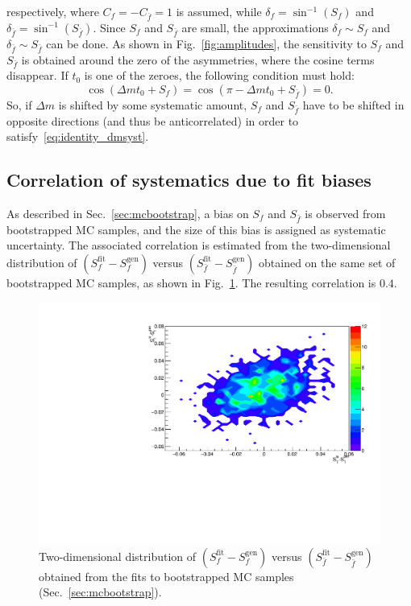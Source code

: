 respectively, where $C_f=-C_{\bar f}=1$ is assumed, while $\delta_f = \sin^{-1}(S_f)$ and $\delta_{\bar f}=\sin^{-1}(S_{\bar f})$.
Since $S_f$ and $S_{\bar f}$ are small, the approximations $\delta_f\sim S_f$ and $\delta_{\bar f}\sim S_{\bar f}$ can be done.
As shown in Fig.~\ref{fig:amplitudes}, the sensitivity to $S_f$ and $S_{\bar f}$ is obtained around the zero of the asymmetries, 
where the cosine terms disappear. If $t_0$ is one of the zeroes, the following condition must hold:
\begin{equation}
  \label{eq:identity_dmsyst}
  \cos(\Delta m t_0 + S_f) = \cos(\pi - \Delta m t_0 + S_{\bar f}) = 0.
\end{equation}
So, if $\Delta m$ is shifted by some systematic amount, $S_f$ and $S_{\bar f}$ have to be shifted in opposite directions (and thus be anticorrelated) in order to satisfy~\ref{eq:identity_dmsyst}.

\subsection{Correlation of systematics due to fit biases}
As described in Sec.~\ref{sec:mcbootstrap}, a bias on $S_f$ and $S_{\bar f}$ is observed from bootstrapped MC samples, and the size of this bias is assigned as systematic uncertainty. The associated correlation is estimated from the two-dimensional distribution of $(S_f^{\textrm{fit}} - S_f^{\textrm{gen}})$ versus $(S_{\bar f}^{\textrm{fit}} - S_{\bar f}^{\textrm{gen}})$ obtained on the same set of bootstrapped MC samples, as shown in Fig.~\ref{fig:fitbias_corr}. The resulting correlation is $0.4$. 
\begin{figure}[t]
        \begin{center}
                \includegraphics[width=0.7\linewidth]{AA-Appdx-corrSyst/figs/fitbias_corr.pdf}
                \end{center}
        \vspace{-2mm}
        \caption{Two-dimensional distribution of $(S_f^{\textrm{fit}} - S_f^{\textrm{gen}})$ versus $(S_{\bar f}^{\textrm{fit}} - S_{\bar f}^{\textrm{gen}})$ obtained from the fits to bootstrapped MC samples (Sec.~\ref{sec:mcbootstrap}).}
        \label{fig:fitbias_corr}
\end{figure}

